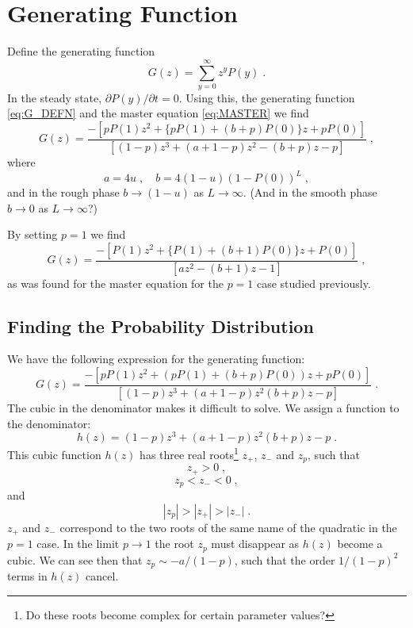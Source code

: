 \documentclass[a4paper,10pt]{article}
\begin{document}
\section{Generating Function}

Define the generating function
\begin{equation}\label{eq:G_DEFN}
 G(z) = \sum_{y=0}^{\infty}z^y P(y) \;. 
\end{equation}
In the steady state, $\partial P(y)/\partial t = 0$. Using this, the generating function \eqref{eq:G_DEFN} and the master equation \eqref{eq:MASTER} we find
\begin{equation}
  G(z) = \frac{ - \left[ pP(1) z^2 + \{ pP(1) + (b+p)P(0) \}z + pP(0) \right] }{ \left[ (1-p)z^3 + (a + 1 - p)z^2 - (b+p) z - p \right] } \;,
\end{equation}
where
\begin{equation}\label{eq:ab_defn}
  a = 4u \;, \quad b = 4(1-u)(1-P(0))^L \;,
\end{equation}
and in the rough phase $b \to (1-u)$ as $L \to \infty$. (And in the smooth phase $b \to 0$ as $L \to \infty$?)

By setting $p=1$ we find
\begin{equation}
  G(z) = \frac{ - \left[ P(1) z^2 + \{ P(1) + (b+1)P(0) \}z + P(0) \right] }{ \left[ a z^2 - (b+1) z - 1 \right] } \;,
\end{equation}
as was found for the master equation for the $p=1$ case studied previously.

\subsection{Finding the Probability Distribution}

We have the following expression for the generating function:
\begin{equation}
  G(z) = \frac{
	       - \left[ p P(1) z^2 + (pP(1) + (b+p)P(0))z + pP(0) \right] 
              }
              {
               \left[ (1-p)z^3 +(a + 1 -p) z^2 (b+p)z -p \right]
              } \;.
\end{equation}
The cubic in the denominator makes it difficult to solve. We assign a function to the denominator:
\begin{equation}
  h(z) = (1-p)z^3 +(a + 1 -p) z^2 (b+p)z -p \;.
\end{equation}
This cubic function $h(z)$ has three real roots\footnote{Do these roots become complex for certain parameter values?} $z_+$, $z_-$ and $z_p$, such that 
\begin{equation}
  z_+ > 0 \;,
\end{equation}
\begin{equation}
  z_p < z_- < 0 \;,
\end{equation}
and
\begin{equation}
  |z_p| > |z_+| > |z_-| \;. 
\end{equation}
$z_+$ and $z_-$ correspond to the two roots of the same name of the quadratic in the $p=1$ case. In the limit $p\to1$ the root $z_p$ must disappear as $h(z)$ become a cubic. We can see then that $z_p \sim -a/(1-p)$, such that the order $1/(1-p)^2$ terms in $h(z)$ cancel. 
\end{document}
